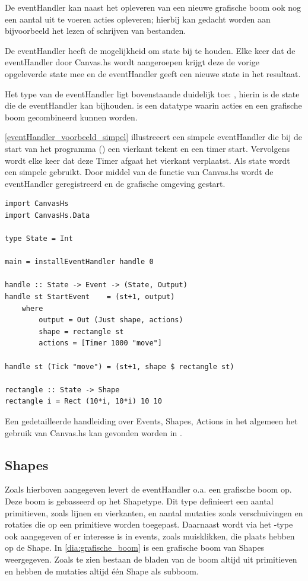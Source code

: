 De eventHandler kan naast het opleveren van een nieuwe grafische boom ook nog een aantal uit te voeren acties opleveren; hierbij kan gedacht worden aan bijvoorbeeld het lezen of schrijven van bestanden. 

De eventHandler heeft de mogelijkheid om state bij te houden. Elke keer dat de eventHandler door Canvas.hs wordt aangeroepen krijgt deze de vorige opgeleverde state mee en de eventHandler geeft een nieuwe state in het resultaat. 

Het type van de eventHandler ligt bovenstaande duidelijk toe: , hierin is  de state die de eventHandler kan bijhouden.  is een datatype waarin acties en een grafische boom gecombineerd kunnen worden.

\autoref{eventHandler_voorbeeld_simpel} illustreeert een simpele eventHandler die bij de start van het programma () een vierkant tekent en een timer start. Vervolgens wordt elke keer dat deze Timer afgaat het vierkant verplaatst. Als state wordt een simpele  gebruikt. Door middel van de  functie van Canvas.hs wordt de eventHandler geregistreerd en de grafische omgeving gestart.

\begin{lstlisting}[caption=Voorbeeld van een simpele eventHandler, label=eventHandler_voorbeeld_simpel]
import CanvasHs
import CanvasHs.Data

type State = Int

main = installEventHandler handle 0

handle :: State -> Event -> (State, Output)
handle st StartEvent    = (st+1, output)
	where 
		output = Out (Just shape, actions)
		shape = rectangle st
		actions = [Timer 1000 "move"]
		
handle st (Tick "move") = (st+1, shape $ rectangle st)
		
rectangle :: State -> Shape
rectangle i = Rect (10*i, 10*i) 10 10
\end{lstlisting}

Een gedetailleerde handleiding over Events, Shapes, Actions in het algemeen het gebruik van Canvas.hs kan gevonden worden in .

\subsection{Shapes}
\label{subsec:globaal_shapes}
Zoals hierboven aangegeven levert de eventHandler o.a. een grafische boom op. Deze boom is gebasseerd op het Shapetype. Dit type definieert een aantal primitieven, zoals lijnen en vierkanten, en aantal mutaties zoals verschuivingen en rotaties die op een primitieve worden toegepast. Daarnaast wordt via het -type ook aangegeven of er interesse is in events, zoals muisklikken, die plaats hebben op de Shape. In \autoref{dia:grafische_boom} is een grafische boom van Shapes weergegeven. Zoals te zien bestaan de bladen van de boom altijd uit primitieven en hebben de mutaties altijd één Shape als subboom.

